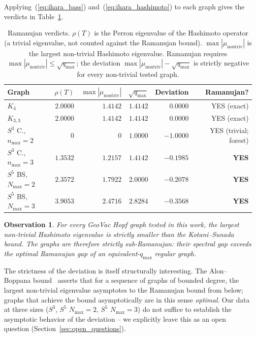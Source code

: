\documentclass[11pt]{article}
\newtheorem{observation}{Observation}
\begin{document}
Applying~(\ref{eq:ihara_bass}) and~(\ref{eq:ihara_hashimoto}) to each
graph gives the verdicts in Table~\ref{tab:ramanujan}.

\begin{table}[h]
\centering
\begin{tabular}{lrrrrr}
\toprule
Graph & $\rho(T)$ & $\max|\mu_{\mathrm{nontriv}}|$ & $\sqrt{q_{\max}}$ & Deviation & Ramanujan? \\
\midrule
$K_4$  & $2.0000$ & $1.4142$ & $1.4142$ & $\phantom{-}0.0000$ & YES (exact) \\
$K_{3,3}$ & $2.0000$ & $1.4142$ & $1.4142$ & $\phantom{-}0.0000$ & YES (exact) \\
$S^3$ C., $n_{\max}=2$ & $0$ & $0$ & $1.0000$ & $-1.0000$ & YES (trivial; forest) \\
$S^3$ C., $n_{\max}=3$ & $1.3532$ & $1.2157$ & $1.4142$ & $-0.1985$ & \textbf{YES} \\
$S^5$ BS, $N_{\max}=2$ & $2.3572$ & $1.7922$ & $2.0000$ & $-0.2078$ & \textbf{YES} \\
$S^5$ BS, $N_{\max}=3$ & $3.9053$ & $2.4716$ & $2.8284$ & $-0.3568$ & \textbf{YES} \\
\bottomrule
\end{tabular}
\caption{Ramanujan verdicts.  $\rho(T)$ is the Perron eigenvalue of the
Hashimoto operator (a trivial eigenvalue, not counted against the
Ramanujan bound).  $\max|\mu_{\mathrm{nontriv}}|$ is the largest
non-trivial Hashimoto eigenvalue.  Ramanujan requires
$\max|\mu_{\mathrm{nontriv}}|\le\sqrt{q_{\max}}$; the deviation
$\max|\mu_{\mathrm{nontriv}}|-\sqrt{q_{\max}}$ is strictly negative
for every non-trivial tested graph.}
\label{tab:ramanujan}
\end{table}

\begin{observation}
\label{obs:ramanujan}
For every GeoVac Hopf graph tested in this work, the largest
non-trivial Hashimoto eigenvalue is strictly smaller than the
Kotani--Sunada bound.  The graphs are therefore strictly
sub-Ramanujan: their spectral gap exceeds the optimal Ramanujan
gap of an equivalent-$q_{\max}$ regular graph.
\end{observation}

The strictness of the deviation is itself structurally interesting.
The Alon--Boppana bound~\cite{alon1986} asserts that for a sequence of
graphs of bounded degree, the largest non-trivial eigenvalue
asymptotes to the Ramanujan bound from below; graphs that achieve the
bound asymptotically are in this sense \emph{optimal}.  Our data at
three sizes ($S^3$, $S^5$ $N_{\max}=2$, $S^5$ $N_{\max}=3$) do not
suffice to establish the asymptotic behavior of the deviation -- we
explicitly leave this as an open question
(Section~\ref{sec:open_questions}).
\end{document}
